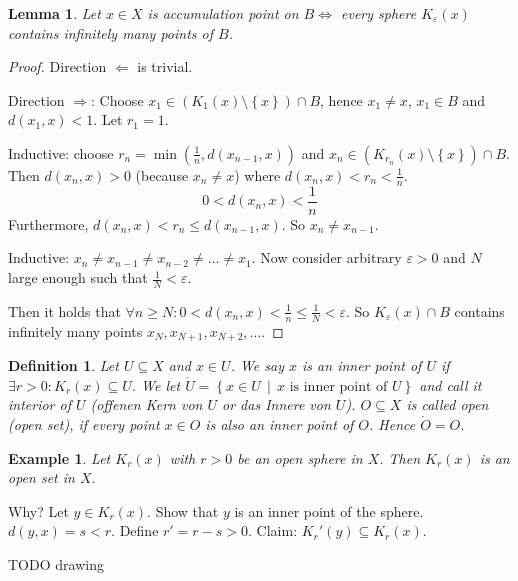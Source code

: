 \documentclass{article}
\newtheorem{example}{Example}  \numberwithin{example}{section}
\newtheorem{definition}{Definition}  \numberwithin{definition}{section}
\newtheorem{lemma}{Lemma}  \numberwithin{lemma}{section}
\newcommand{\set}[1]{\left\{#1\right\}}
\newcommand{\setdef}[2]{\left\{\left.#1\,\middle|\,#2\right.\right\}}
\begin{document}
\begin{lemma}
  Let $x \in X$ is accumulation point on $B \iff$ every sphere $K_{\varepsilon}(x)$ contains infinitely many points of $B$.
\end{lemma}
\begin{proof}
  Direction $\Leftarrow$ is trivial.

  Direction $\Rightarrow$:
  Choose $x_1 \in (K_1(x) \setminus \set{x}) \cap B$, hence $x_1 \neq x$, $x_1 \in B$ and $d(x_1, x) < 1$.
  Let $r_1 = 1$.

  Inductive: choose $r_n = \min(\frac1n, d(x_{n-1}, x))$ and $x_n \in (K_{r_n}(x) \setminus \set{x}) \cap B$.
  Then $d(x_n, x) > 0$ (because $x_n \neq x$) where $d(x_n, x) < r_n < \frac1n$.
  \[ 0 < d(x_n, x) < \frac1n \]
  Furthermore, $d(x_n, x) < r_n \leq d(x_{n-1}, x)$.
  So $x_n \neq x_{n-1}$.

  Inductive: $x_n \neq x_{n-1} \neq x_{n-2} \neq \dots \neq x_1$.
  Now consider arbitrary $\varepsilon > 0$ and $N$ large enough such that $\frac1N < \varepsilon$.

  Then it holds that $\forall n \geq N: 0 < d(x_n, x) < \frac1n \leq \frac1N < \varepsilon$.
  So $K_{\varepsilon}(x) \cap B$ contains infinitely many points $x_N, x_{N+1}, x_{N+2}, \dots$.
\end{proof}

\begin{definition} %
  Let $U \subseteq X$ and $x \in U$.
  We say $x$ is an \emph{inner point of $U$} if $\exists r > 0: K_r(x) \subseteq U$.
  We let $\mathring{U} = \setdef{x \in U}{x \text{ is inner point of } U}$ and call it \emph{interior of $U$} (\foreignlanguage{german}{offenen Kern von $U$} or \foreignlanguage{german}{das Innere von $U$}).
  $O \subseteq X$ is called \emph{open} (open set), if every point $x \in O$ is also an inner point of $O$.
  Hence $\mathring{O} = O$.
\end{definition}


\begin{example}
  Let $K_r(x)$ with $r > 0$ be an open sphere in $X$.
  Then $K_r(x)$ is an open set in $X$.
\end{example}

Why? Let $y \in K_r(x)$. Show that $y$ is an inner point of the sphere.
$d(y,x) = s < r$. Define $r' = r - s > 0$.
Claim: $K_r'(y) \subseteq K_r(x)$.

TODO drawing %
\end{document}
